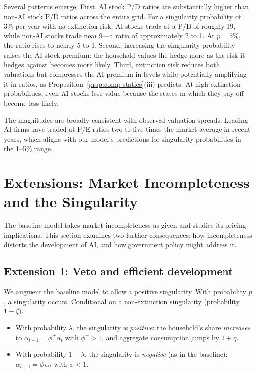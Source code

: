 \documentclass[12pt]{article}
\begin{document}
Several patterns emerge. First, AI stock P/D ratios are substantially higher than non-AI stock P/D ratios across the entire grid. For a singularity probability of 3\% per year with no extinction risk, AI stocks trade at a P/D of roughly 19, while non-AI stocks trade near 9---a ratio of approximately 2 to 1. At $p = 5\%$, the ratio rises to nearly 5 to 1. Second, increasing the singularity probability raises the AI stock premium: the household values the hedge more as the risk it hedges against becomes more likely. Third, extinction risk reduces both valuations but compresses the AI premium in levels while potentially amplifying it in ratios, as Proposition~\ref{prop:comp-statics}(iii) predicts. At high extinction probabilities, even AI stocks lose value because the states in which they pay off become less likely.

The magnitudes are broadly consistent with observed valuation spreads. Leading AI firms have traded at P/E ratios two to five times the market average in recent years, which aligns with our model's predictions for singularity probabilities in the 1--5\% range.

\section{Extensions: Market Incompleteness and the Singularity} %

The baseline model takes market incompleteness as given and studies its pricing implications. This section examines two further consequences: how incompleteness distorts the development of AI, and how government policy might address it.

\subsection{Extension 1: Veto and efficient development} %

We augment the baseline model to allow a positive singularity. With probability $p$, a singularity occurs. Conditional on a non-extinction singularity (probability $1 - \xi$):
%
\begin{itemize}
\item With probability $\lambda$, the singularity is \emph{positive}: the household's share \emph{increases} to $\alpha_{t+1} = \phi^+ \alpha_t$ with $\phi^+ > 1$, and aggregate consumption jumps by $1 + \eta$.
\item With probability $1 - \lambda$, the singularity is \emph{negative} (as in the baseline): $\alpha_{t+1} = \phi \, \alpha_t$ with $\phi < 1$.
\end{itemize}
\end{document}
